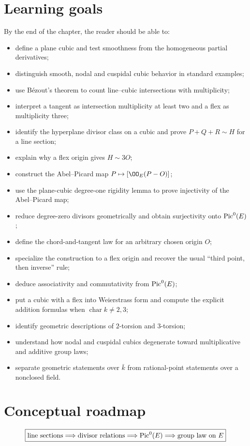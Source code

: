 \section*{Learning goals}
By the end of the chapter, the reader should be able to:
\begin{itemize}
\item define a plane cubic and test smoothness from the homogeneous partial derivatives;
\item distinguish smooth, nodal and cuspidal cubic behavior in standard examples;
\item use B\'ezout's theorem to count line--cubic intersections with multiplicity;
\item interpret a tangent as intersection multiplicity at least two and a flex as multiplicity three;
\item identify the hyperplane divisor class on a cubic and prove \(P+Q+R\sim H\) for a line section;
\item explain why a flex origin gives \(H\sim3O\);
\item construct the Abel--Picard map \(P\mapsto[\OO_E(P-O)]\);
\item use the plane-cubic degree-one rigidity lemma to prove injectivity of the Abel--Picard map;
\item reduce degree-zero divisors geometrically and obtain surjectivity onto \(\operatorname{Pic}^0(E)\);
\item define the chord-and-tangent law for an arbitrary chosen origin \(O\);
\item specialize the construction to a flex origin and recover the usual ``third point, then inverse'' rule;
\item deduce associativity and commutativity from \(\operatorname{Pic}^0(E)\);
\item put a cubic with a flex into Weierstrass form and compute the explicit addition formulas when \(\operatorname{char}k\neq2,3\);
\item identify geometric descriptions of \(2\)-torsion and \(3\)-torsion;
\item understand how nodal and cuspidal cubics degenerate toward multiplicative and additive group laws;
\item separate geometric statements over \(\bar k\) from rational-point statements over a nonclosed field.
\end{itemize}

\section*{Conceptual roadmap}
\[
\boxed{
\text{line sections}
\Longrightarrow
\text{divisor relations}
\Longrightarrow
\operatorname{Pic}^0(E)
\Longrightarrow
\text{group law on }E
}
\]


